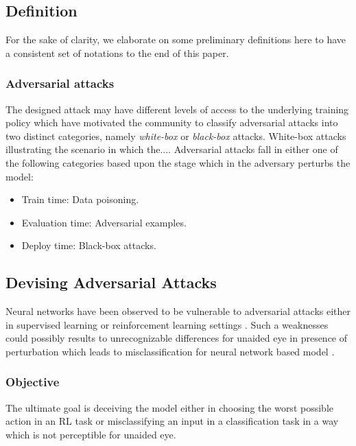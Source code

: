 \documentclass[letterpaper,12pt]{article}
\begin{document}
\subsection{Definition}
For the sake of clarity, we elaborate on some preliminary definitions here to have a consistent set of notations to the end of this paper.

\subsubsection{Adversarial attacks}
The designed attack may have different levels of access to the underlying training policy which have motivated the community to classify adversarial attacks into two distinct categories, namely \textit{white-box} or \textit{black-box} attacks. White-box attacks illustrating the scenario in which the.... Adversarial attacks fall in either one of the following categories based upon the stage which in the adversary perturbs the model:
\begin{itemize}
    \item Train time: Data poisoning.
    \item Evaluation time: Adversarial examples.
    \item Deploy time: Black-box attacks.
\end{itemize}


\subsection{Devising Adversarial Attacks}
Neural networks have been observed to be vulnerable to adversarial attacks either in supervised learning or reinforcement learning settings \cite{Huang2017}. Such a weaknesses could possibly results to unrecognizable differences for unaided eye in presence of perturbation which leads to misclassification for neural network based model \cite{Szegedy2014, Goodfellow2014}. 

\subsubsection{Objective}
The ultimate goal is deceiving the model either in choosing the worst possible action in an RL task or misclassifying an input in a classification task in a way which is not perceptible for unaided eye.







\end{document}
